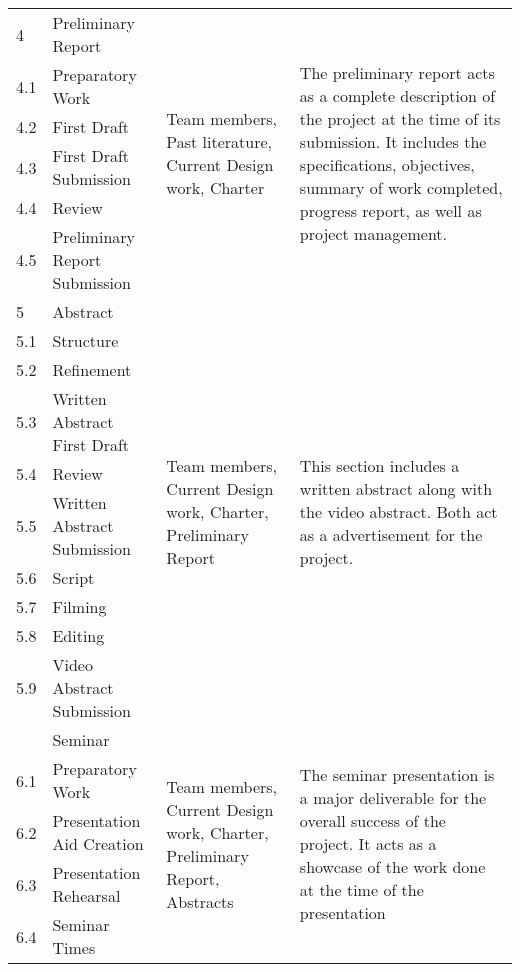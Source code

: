 \begin{longtable}[c]{|l|l|p{4cm}|p{10cm}|}
4 & Preliminary Report & \multirow{6}{*}{\parbox{4cm}{Team members, Past literature, Current Design work, Charter}} & \multirow{6}{*}{\parbox{10cm}{\scriptsize{The preliminary report acts as a complete description of the project at the time of its submission. It includes the specifications, objectives, summary of work completed, progress report, as well as project management.}}} \\ \cline{1-2}
4.1 & Preparatory Work &  &  \\ \cline{1-2}
4.2 & First Draft &  &  \\ \cline{1-2}
4.3 & First Draft Submission &  &  \\ \cline{1-2}
4.4 & Review &  &  \\ \cline{1-2}
4.5 & Preliminary Report Submission &  &  \\ \hline
5 & Abstract & \multirow{10}{*}{\parbox{4cm}{Team members, Current Design work, Charter, Preliminary Report}} & \multirow{10}{*}{\parbox{10cm}{This section includes a written abstract along with the video abstract. Both act as a advertisement for the project.}} \\ \cline{1-2}
5.1 & Structure &  &  \\ \cline{1-2}
5.2 & Refinement &  &  \\ \cline{1-2}
5.3 & Written Abstract First Draft &  &  \\ \cline{1-2}
5.4 & Review &  &  \\ \cline{1-2}
5.5 & Written Abstract Submission &  &  \\ \cline{1-2}
5.6 & Script &  &  \\ \cline{1-2}
5.7 & Filming &  &  \\ \cline{1-2}
5.8 & Editing &  &  \\ \cline{1-2}
5.9 & Video Abstract Submission &  &  \\ \hline  \newpage
6 & Seminar & \multirow{6}{*}{\parbox{4cm}{Team members, Current Design work, Charter, Preliminary Report, Abstracts}} & \multirow{6}{*}{\parbox{10cm}{The seminar presentation is a major deliverable for the overall success of the project. It acts as a showcase of the work done at the time of the presentation}} \\ \cline{1-2}
6.1 & Preparatory Work &  &  \\ \cline{1-2}
6.2 & Presentation Aid Creation &  &  \\ \cline{1-2}
6.3 & Presentation Rehearsal &  &  \\ \cline{1-2}
6.4 & Seminar Times &  &  \\ \cline{1-2}

\end{longtable}
